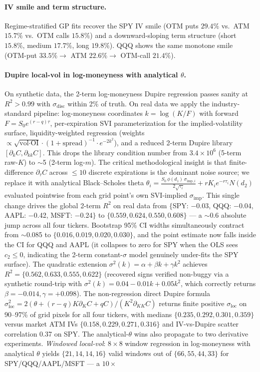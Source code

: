 \documentclass[10pt]{article}
\begin{document}
\paragraph{IV smile and term structure.} Regime-stratified GP fits recover the SPY IV smile (OTM puts $29.4\%$ vs.\ ATM $15.7\%$ vs.\ OTM calls $15.8\%$) and a downward-sloping term structure (short $15.8\%$, medium $17.7\%$, long $19.8\%$). QQQ shows the same monotone smile (OTM-put $33.5\% \to$ ATM $22.6\% \to$ OTM-call $21.4\%$).

\paragraph{Dupire local-vol in log-moneyness with analytical $\theta$.} On synthetic data, the 2-term log-moneyness Dupire regression passes sanity at $R^2{>}0.99$ with $\sigma_{\text{disc}}$ within 2\% of truth. On real data we apply the industry-standard pipeline: log-moneyness coordinates $k=\log(K/F)$ with forward $F=S_0 e^{(r-q)\tau}$, per-expiration SVI parameterization \citep{gatheral2014arbitrage} for the implied-volatility surface, liquidity-weighted regression (weights $\propto \sqrt{\text{vol}\cdot \text{OI}} \cdot (1+\text{spread})^{-1} \cdot e^{-2k^2}$), and a reduced 2-term Dupire library $[\partial_k C, \partial_{kk}C]$. This drops the library condition number from $3.4\times10^6$ (5-term raw-$K$) to $\sim$5 (2-term log-$m$). The critical methodological insight is that finite-difference $\partial_\tau C$ across $\le10$ discrete expirations is the dominant noise source; we replace it with analytical Black--Scholes theta $\theta_i=\frac{S_0\,\phi(d_1)\,\sigma_{\text{imp},i}}{2\sqrt{\tau_i}}+rK_i e^{-r\tau_i}N(d_2)$ evaluated pointwise from each grid point's own SVI-implied $\sigma_{\text{imp}}$. This single change drives the global 2-term $R^2$ on real data from $\{$SPY: $-$0.03, QQQ: $-$0.04, AAPL: $-$0.42, MSFT: $-$0.24$\}$ to $\{0.559, 0.624, 0.550, 0.608\}$ --- a $\sim$0.6 absolute jump across all four tickers. Bootstrap 95\% CI widths simultaneously contract from $\sim$0.085 to $\{0.016, 0.019, 0.020, 0.030\}$, and the point estimate now falls inside the CI for QQQ and AAPL (it collapses to zero for SPY when the OLS sees $c_2{\le}0$, indicating the 2-term constant-$\sigma$ model genuinely under-fits the SPY surface). The quadratic extension $\sigma^2(k){=}\alpha+\beta k+\gamma k^2$ achieves $R^2{=}\{0.562, 0.633, 0.555, 0.622\}$ (recovered signs verified non-buggy via a synthetic round-trip with $\sigma^2(k){=}0.04{-}0.01k{+}0.05k^2$, which correctly returns $\beta{=}{-}0.014, \gamma{=}{+}0.098$). The non-regression direct Dupire formula $\sigma^2_{\text{loc}}{=}2(\theta+(r{-}q)K\partial_K C+qC)/(K^2\partial_{KK}C)$ returns finite positive $\sigma_{\text{loc}}$ on 90--97\% of grid pixels for all four tickers, with medians $\{0.235, 0.292, 0.301, 0.359\}$ versus market ATM IVs $\{0.158, 0.229, 0.271, 0.316\}$ and IV-vs-Dupire scatter correlation 0.37 on SPY. The analytical-$\theta$ wins also propagate to two derivative experiments. \emph{Windowed local-vol}: $8{\times}8$ window regression in log-moneyness with analytical $\theta$ yields $\{21, 14, 14, 16\}$ valid windows out of $\{66, 55, 44, 33\}$ for SPY/QQQ/AAPL/MSFT --- a $10{\times}$ 
\end{document}
